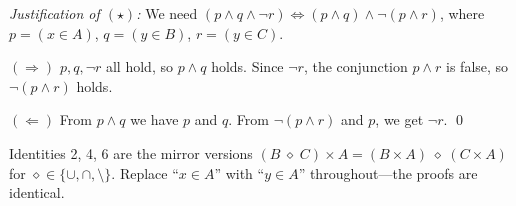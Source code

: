 \documentclass[12pt, a4paper]{article}
\begin{document}
\textit{Justification of $(\star)$:}\;
We need
$(p \land q \land \lnot r)
 \iff
(p \land q) \land \lnot(p \land r)$,
where $p = (x \in A)$, $q = (y \in B)$, $r = (y \in C)$.

$(\Rightarrow)$\;
$p, q, \lnot r$ all hold, so $p \land q$ holds.
Since $\lnot r$, the conjunction $p \land r$ is false,
so $\lnot(p \land r)$ holds.

$(\Leftarrow)$\;
From $p \land q$ we have $p$ and $q$.
From $\lnot(p \land r)$ and $p$, we get $\lnot r$.
\qed

\bigskip
\begin{answerbox}
\centering
Identities 2, 4, 6 are the mirror versions
$(B \;\diamond\; C) \times A = (B \times A) \;\diamond\; (C \times A)$
for $\diamond \in \{\cup, \cap, \setminus\}$.
Replace ``$x \in A$'' with ``$y \in A$'' throughout---the proofs are identical.
\end{answerbox}
\end{document}
